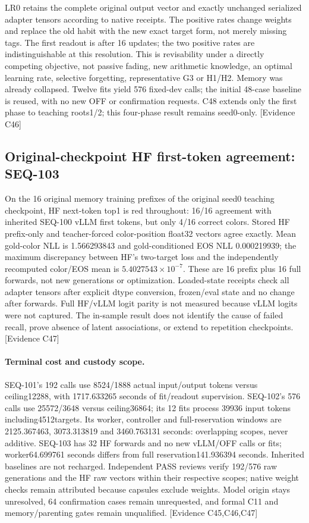 \documentclass[11pt]{article}
\newcommand{\ev}[1]{\textsf{[Evidence #1]}}
\begin{document}
LR0 retains the complete original output vector and exactly unchanged serialized
adapter tensors according to native receipts. The positive rates change weights
and replace the old habit with the new exact target form, not merely missing tags.
The first readout is after 16 updates; the two positive rates are indistinguishable
at this resolution. This is revisability under a directly competing objective,
not passive fading, new arithmetic knowledge, an optimal learning rate, selective
forgetting, representative G3 or H1/H2. Memory was already collapsed. Twelve fits
yield 576 fixed-dev calls; the initial 48-case baseline is reused, with no new OFF
or confirmation requests. C48 extends only the first phase to teaching roots1/2;
this four-phase result remains seed0-only. \ev{C46}

\subsection{Original-checkpoint HF first-token agreement: SEQ-103}
On the 16 original memory training prefixes of the original seed0 teaching
checkpoint, HF next-token top1 is red throughout: 16/16 agreement with inherited
SEQ-100 vLLM first tokens, but only 4/16 correct colors. Stored HF prefix-only
and teacher-forced color-position float32 vectors agree exactly. Mean gold-color
NLL is 1.566293843 and gold-conditioned EOS NLL 0.000219939; the maximum discrepancy
between HF's two-target loss and the independently recomputed color/EOS mean is
$5.4027543\times10^{-7}$. These are 16 prefix plus 16 full forwards, not new
generations or optimization. Loaded-state receipts check all adapter tensors
after explicit dtype conversion, frozen/eval state and no change after forwards.
Full HF/vLLM logit parity is not measured because vLLM logits were not captured.
The in-sample result does not identify the cause of failed recall, prove absence
of latent associations, or extend to repetition checkpoints. \ev{C47}

\paragraph{Terminal cost and custody scope.} SEQ-101's 192 calls use 8524/1888
actual input/output tokens versus ceiling12288, with 1717.633265 seconds of
fit/readout supervision. SEQ-102's 576 calls use 25572/3648 versus ceiling36864;
its 12 fits process 39936 input tokens including4512targets. Its worker,
controller and full-reservation windows are 2125.367463, 3073.313819 and
3460.763131 seconds: overlapping scopes, never additive. SEQ-103 has 32 HF
forwards and no new vLLM/OFF calls or fits; worker64.699761 seconds differs from
full reservation141.936394 seconds. Inherited baselines are not recharged.
Independent PASS reviews verify 192/576 raw generations and the HF raw vectors
within their respective scopes; native weight checks remain attributed because
capsules exclude weights. Model origin stays unresolved, 64 confirmation cases
remain unrequested, and formal C11 and memory/parenting gates remain unqualified. \ev{C45,C46,C47}
\end{document}
